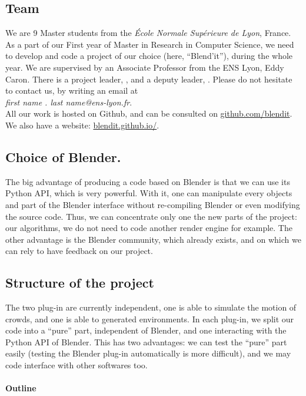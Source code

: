 \subsection{Team}

We are 9 Master students from the \textit{École Normale Supérieure de
Lyon}, France. As a part of our First year of Master in Research in
Computer Science, we need to develop and code a project of our choice
(here, ``Blend'it''), during the whole year. We are supervised by an
Associate Professor from the ENS Lyon, Eddy Caron. There is a project
leader, \me, and a deputy leader, \mr. Please do not hesitate to
contact us, by writing an email at \\
\textit{first name . last name@ens-lyon.fr}.\\

All our work is hosted on Github, and can be consulted on
\url{github.com/blendit}. We also have a website:
\url{blendit.github.io/}.


\subsection{Choice of Blender.}

The big advantage of producing a code based on Blender is that we can
use its Python API, which is very powerful. With it, one can
manipulate every objects and part of the Blender interface without
re-compiling Blender or even modifying the source code. Thus, we can
concentrate only one the new parts of the project: our algorithms, we
do not need to code another render engine for example.  The other
advantage is the Blender community, which already exists, and on which
we can rely to have feedback on our project.


\subsection{Structure of the project}

The two plug-in are currently independent, one is able to simulate the
motion of crowds, and one is able to generated environments. In each
plug-in, we split our code into a ``pure'' part, independent of
Blender, and one interacting with the Python API of Blender. This has
two advantages: we can test the ``pure'' part easily (testing the
Blender plug-in automatically is more difficult), and we may code
interface with other softwares too.



\paragraph{Outline}

